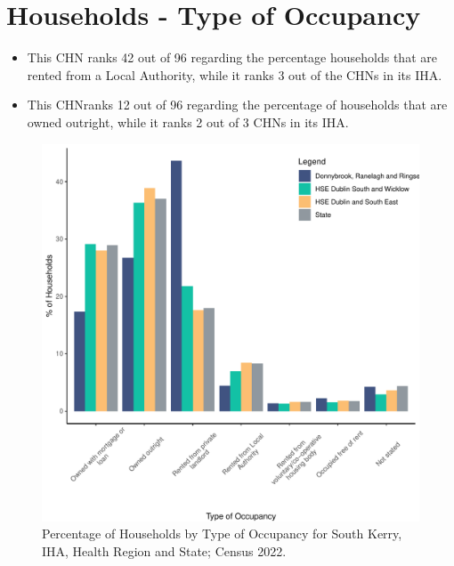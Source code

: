 \documentclass{article}
\begin{document}
\section{Households - Type of Occupancy}\label{sect:Households}
\begin{itemize}
\item This CHN ranks  42 out of 96 regarding the percentage households that are rented from a Local Authority, while it ranks  3 out of the CHNs in its IHA. 
\item This CHNranks  12 out of 96 regarding the percentage of households that are owned outright, while it ranks   2 out of 3 CHNs in its IHA.
\end{itemize}
\begin{figure}[H]
	\centering
	\includegraphics[width = 140mm]{../figures/HouseholdsED.pdf}
	\caption{Percentage of Households by Type of Occupancy for South Kerry, IHA, Health Region and State; Census 2022.}
	\label{fig:vbnv}
	\end{figure}
\end{document}
